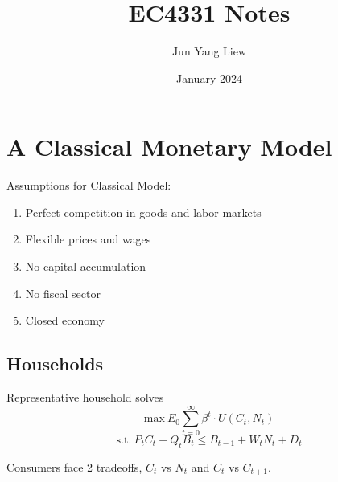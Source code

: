 \documentclass{article}
\title{EC4331 Notes}
\author{Jun Yang Liew}
\date{January 2024}
\begin{document}
\maketitle

\tableofcontents

\pagebreak

\section{A Classical Monetary Model}
Assumptions for Classical Model:
\begin{enumerate}
    \item Perfect competition in goods and labor markets
    \item Flexible prices and wages
    \item No capital accumulation
    \item No fiscal sector
    \item Closed economy
\end{enumerate}

\subsection{Households}
Representative household solves
$$\text{max}\ E_0 \sum_{t=0}^{\infty} \beta^t\cdot U(C_t, N_t)$$
$$\text{s.t.}\ P_t C_t + Q_t B_t \leq B_{t-1} + W_tN_t + D_t$$

Consumers face 2 tradeoffs, $C_t$ vs $N_t$ and $C_t$ vs $C_{t+1}$.\\
\end{document}
